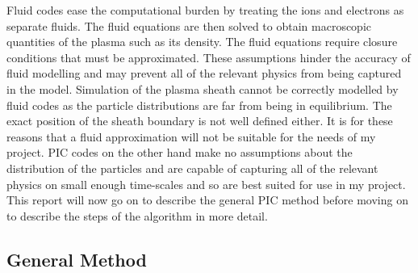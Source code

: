 \documentclass[12pt]{article}
\begin{document}
Fluid codes ease the computational burden by treating the ions and electrons as separate fluids. The fluid equations are then solved to obtain macroscopic quantities of the plasma such as its density. The fluid equations require closure conditions that must be approximated. These assumptions hinder the accuracy of fluid modelling and may prevent all of the relevant physics from being captured in the model. Simulation of the plasma sheath cannot be correctly modelled by fluid codes as the particle distributions are far from being in equilibrium. The exact position of the sheath boundary is not well defined either. It is for these reasons that a fluid approximation will not be suitable for the needs of my project. PIC codes on the other hand make no assumptions about the distribution of the particles and are capable of capturing all of the relevant physics on small enough time-scales and so are best suited for use in my project. This report will now go on to describe the general PIC method before moving on to describe the steps of the algorithm in more detail. 

\newpage

\subsection{General Method} 
\end{document}
